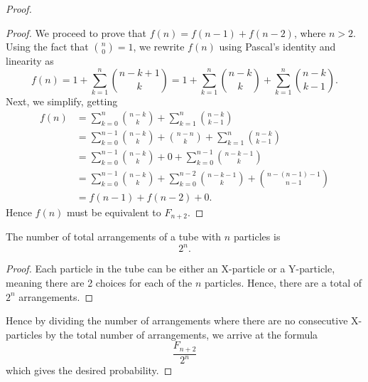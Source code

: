 \begin{proof}
\begin{proof}
  We proceed to prove that $f(n) = f(n-1) + f(n-2)$, where $n > 2$. Using the fact that $\binom{n}{0} = 1$, we rewrite $f(n)$ using Pascal's identity and linearity as \[
    f(n) = 1 + \sum_{k=1}^n \binom{n-k+1}{k} = 1 + \sum_{k=1}^n \binom{n-k}{k} + \sum_{k=1}^n \binom{n-k}{k-1}.
  \] Next, we simplify, getting
  \begin{align*}
    f(n) &= \sum_{k=0}^n \binom{n - k}{k} + \sum_{k=1}^n \binom{n-k}{k-1} \\
         &= \sum_{k=0}^{n-1} \binom{n-k}{k} + \binom{n-n}{k} + \sum_{k=1}^n \binom{n-k}{k-1} \\
         &= \sum_{k=0}^{n-1} \binom{n-k}{k} + 0 + \sum_{k=0}^{n-1} \binom{n-k-1}{k} \\
         &= \sum_{k=0}^{n-1} \binom{n-k}{k} + \sum_{k=0}^{n-2} \binom{n-k-1}{k} + \binom{n-(n-1)-1}{n-1} \\
         &= f(n-1) + f(n-2) + 0.
  \end{align*}
  Hence $f(n)$ must be equivalent to $F_{n+2}$.
\end{proof}
\begin{claim}
  The number of total arrangements of a tube with $n$ particles is \[2^n.\]
\end{claim}
\begin{proof}
  Each particle in the tube can be either an X-particle or a Y-particle, meaning there are 2 choices for each of the $n$ particles. Hence, there are a total of $2^n$ arrangements.
\end{proof}
Hence by dividing the number of arrangements where there are no consecutive X-particles by the total number of arrangements, we arrive at the formula \[\frac{F_{n+2}}{2^n}\] which gives the desired probability.
\end{proof}

